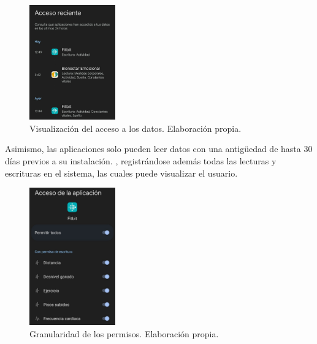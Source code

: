             \begin{figure}[h]
                \centering
                \includegraphics[width=0.33\textwidth]{figures/Health Connect acceso reciente.jpg}
                \caption[Visualización del acceso a los datos.]
                {Visualización del acceso a los datos. Elaboración propia.}
                \label{figure:health_connect:acceso_reciente}
            \end{figure}

            
            Asimismo, las aplicaciones solo pueden leer datos con una antigüedad de 
            hasta 30 días previos a su instalación. \cite{noauthor_preguntas_nodate}, registrándose además todas las 
            lecturas y escrituras en el sistema, las cuales puede visualizar el usuario. 

            \begin{figure}[h]
                \centering
                \includegraphics[width=0.33\textwidth]{figures/Health connect permisos fitbit.jpg}
                \caption[Granularidad de los permisos.]
                {Granularidad de los permisos. Elaboración propia.}
                \label{figure:health_connect:granularidad_permisos}
            \end{figure}

